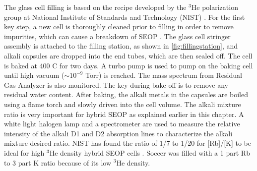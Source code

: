 
The glass cell filling is based on the recipe developed by the $^3$He polarization group at National Institute of Standards and Technology (NIST) \cite{Chen2011}. For the first key step, a new cell is thoroughly cleaned prior to filling in order to remove impurities, which can cause a breakdown of SEOP \cite{Chen2011, Jiang2013}. The glass cell stringer assembly is attached to the filling station, as shown in  \cref{fig:fillingstation}, and alkali capsules are dropped into the end tubes, which are then sealed off. The cell is baked at 400 \degree C for two days. A turbo pump is used to pump on the baking cell until high vacuum ($ \sim 10^{-9}$ Torr) is reached. The mass spectrum from Residual Gas Analyzer is also monitored. The key during bake off is to remove any residual water content. After baking, the alkali metals in the capsules are boiled using a flame torch and slowly driven into the cell volume. The alkali mixture ratio is very important for hybrid SEOP as explained earlier in this chapter. A white light halogen lamp and a spectrometer are used to measure the relative intensity of the alkali D1 and D2 absorption lines to characterize the alkali mixture desired ratio. NIST has found the ratio of 1/7 to 1/20 for [Rb]/[K] to be ideal for high $^3$He density hybrid SEOP cells \cite{Chen2011}. Soccer was filled with a 1 part Rb to 3 part K ratio because of its low $^3$He density.


